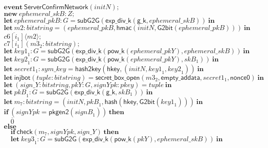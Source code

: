 \documentclass{article}
\newcommand{\cinput}[2]{{#1}({#2})}
\newcommand{\coutput}[2]{\overline{#1}\langle{#2}\rangle}
\newcommand{\kw}[1]{\mathbf{#1}}
\newcommand{\kwf}[1]{\mathsf{#1}}
\newcommand{\var}[1]{\mathit{#1}}
\newcommand{\kwt}[1]{\mathit{#1}}
\newcommand{\kwc}[1]{\mathit{#1}}
\begin{document}
\begin{tabbing}
\>$\quad \kw{event}\ \kwf{ServerConfirmNetwork}(\var{initN});$\\
\>$\quad \kw{new}\ \var{ephemeral{\_}skB}: \kwt{Z};$\\
\>$\quad \kw{let}\ \var{ephemeral{\_}pkB}: \kwt{G} = \kwf{subG2G}(\kwf{exp{\_}div{\_}k}(\kwf{g{\_}k}, \var{ephemeral{\_}skB}))\ \kw{in}$\\
\>$\quad \kw{let}\ \var{m2}: \kwt{bitstring} = \kwf{}(\var{ephemeral{\_}pkB}, \kwf{hmac}(\var{initN}, \kwf{G2bit}(\var{ephemeral{\_}pkB})))\ \kw{in}$\\
\>$\quad \coutput{\kwc{c6}[\var{i}_{1}]}{\var{m2}};$\\
\>$\quad \cinput{\kwc{c7}[\var{i}_{1}]}{\var{m3}_{2}: \kwt{bitstring}};$\\
\>$\quad \kw{let}\ \var{key1}_{1}: \kwt{G} = \kwf{subG2G}(\kwf{exp{\_}div{\_}k}(\kwf{pow{\_}k}(\var{ephemeral{\_}pkY}), \var{ephemeral{\_}skB}))\ \kw{in}$\\
\>$\quad \kw{let}\ \var{key2}_{1}: \kwt{G} = \kwf{subG2G}(\kwf{exp{\_}div{\_}k}(\kwf{pow{\_}k}(\var{ephemeral{\_}pkY}), \var{skB}_{1}))\ \kw{in}$\\
\>$\quad \kw{let}\ \var{secret1}_{1}: \kwt{sym{\_}key} = \kwf{hash2key}(\kwf{hkey}, \kwf{}(\var{initN}, \var{key1}_{1}, \var{key2}_{1}))\ \kw{in}$\\
\>$\quad \kw{let}\ \kwf{injbot}(\var{tuple}: \kwt{bitstring}) = \kwf{secret{\_}box{\_}open}(\var{m3}_{2}, \kwf{empty{\_}addata}, \var{secret1}_{1}, \kwf{nonce0})\ \kw{in}$\\
\>$\quad \kw{let}\ \kwf{}(\var{sign{\_}Y}: \kwt{bitstring}, \var{pkY}: \kwt{G}, \var{signYpk}: \kwt{pkey}) = \var{tuple}\ \kw{in}$\\
\>$\quad \kw{let}\ \var{pkB}_{1}: \kwt{G} = \kwf{subG2G}(\kwf{exp{\_}div{\_}k}(\kwf{g{\_}k}, \var{skB}_{1}))\ \kw{in}$\\
\>$\quad \kw{let}\ \var{m}_{7}: \kwt{bitstring} = \kwf{}(\var{initN}, \var{pkB}_{1}, \kwf{hash}(\kwf{hkey}, \kwf{G2bit}(\var{key1}_{1})))\ \kw{in}$\\
\>$\quad \kw{if}\ (\var{signYpk}  =  \kwf{pkgen2}(\var{signB}_{1}))\ \kw{then}$\\
\>$\quad \quad \overline{0}$\\
\>$\quad \kw{else}$\\
\>$\quad \quad \kw{if}\ \kwf{check}(\var{m}_{7}, \var{signYpk}, \var{sign{\_}Y})\ \kw{then}$\\
\>$\quad \quad \kw{let}\ \var{key3}_{1}: \kwt{G} = \kwf{subG2G}(\kwf{exp{\_}div{\_}k}(\kwf{pow{\_}k}(\var{pkY}), \var{ephemeral{\_}skB}))\ \kw{in}$\\

\end{tabbing}
\end{document}
